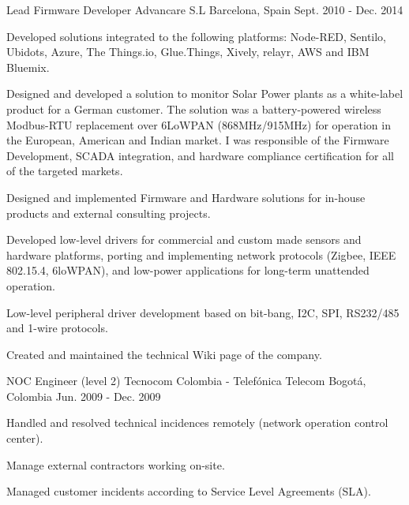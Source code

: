 \begin{cventries}
  \cventry
    {Lead Firmware Developer} %
    {Advancare S.L} %
    {Barcelona, Spain} %
    {Sept. 2010 - Dec. 2014} %
    {
      \begin{cvitems} %
        \item {Developed solutions integrated to the following platforms: Node-RED, Sentilo, Ubidots, Azure, The Things.io, Glue.Things, Xively, relayr, AWS and IBM Bluemix.}
        \item {Designed and developed a solution to monitor Solar Power plants as a white-label product for a German customer.  The solution was a battery-powered wireless Modbus-RTU replacement over 6LoWPAN (868MHz/915MHz) for operation in the European, American and Indian market.  I was responsible of the Firmware Development, SCADA integration, and hardware compliance certification for all of the targeted markets.}
        \item {Designed and implemented Firmware and Hardware solutions for in-house products and external consulting projects.}
        \item {Developed low-level drivers for commercial and custom made sensors and hardware platforms, porting and implementing network protocols (Zigbee, IEEE 802.15.4, 6loWPAN), and low-power applications for long-term unattended operation.}
        \item {Low-level peripheral driver development based on bit-bang, I2C, SPI, RS232/485 and 1-wire protocols.}
        \item {Created and maintained the technical Wiki page of the company.}
      \end{cvitems}
    }

  \cventry
    {NOC Engineer (level 2)} %
    {Tecnocom Colombia - Telefónica Telecom} %
    {Bogotá, Colombia} %
    {Jun. 2009 - Dec. 2009} %
    {
      \begin{cvitems} %
        \item {Handled and resolved technical incidences remotely (network operation control center).}
        \item {Manage external contractors working on-site.}
        \item {Managed customer incidents according to Service Level Agreements (SLA).}        
      \end{cvitems}
    }

\end{cventries}
